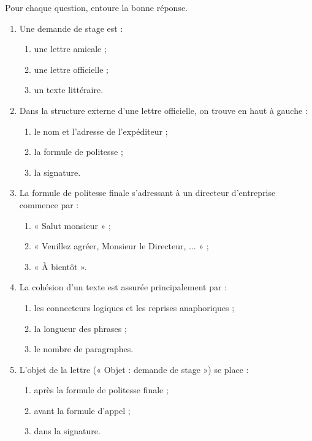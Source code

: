 \documentclass[11pt]{article}
\begin{document}
\begin{exercice}
Pour chaque question, entoure la bonne réponse.
\begin{enumerate}
\item Une demande de stage est :
\begin{enumerate}
\item une lettre amicale ;
\item une lettre officielle ;
\item un texte littéraire.
\end{enumerate}
\item Dans la structure externe d'une lettre officielle, on trouve en haut à gauche :
\begin{enumerate}
\item le nom et l'adresse de l'expéditeur ;
\item la formule de politesse ;
\item la signature.
\end{enumerate}
\item La formule de politesse finale s'adressant à un directeur d'entreprise commence par :
\begin{enumerate}
\item « Salut monsieur » ;
\item « Veuillez agréer, Monsieur le Directeur, ... » ;
\item « À bientôt ».
\end{enumerate}
\item La cohésion d'un texte est assurée principalement par :
\begin{enumerate}
\item les connecteurs logiques et les reprises anaphoriques ;
\item la longueur des phrases ;
\item le nombre de paragraphes.
\end{enumerate}
\item L'objet de la lettre (« Objet : demande de stage ») se place :
\begin{enumerate}
\item après la formule de politesse finale ;
\item avant la formule d'appel ;
\item dans la signature.
\end{enumerate}
\end{enumerate}
\end{exercice}
\end{document}

